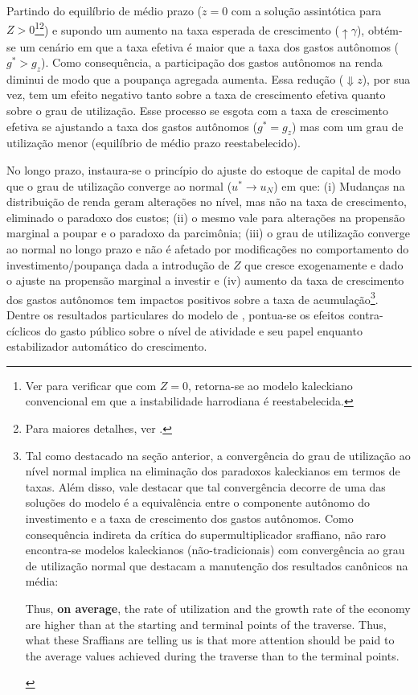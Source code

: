 Partindo do equilíbrio de médio prazo ($\dot z = 0$ com a solução assintótica para $Z >0$\footnote{Ver \textcite[Apêndice A]{allain_tackling_2015} para verificar que com $Z = 0$, retorna-se ao modelo kaleckiano convencional em que a instabilidade harrodiana é reestabelecida.}\footnote{Para maiores detalhes, ver \textcite{fagundes_role_2017}.}) e supondo um aumento na taxa esperada de crescimento ($\uparrow\gamma$), obtém-se um cenário em que a taxa efetiva é maior que a taxa dos gastos autônomos ($g^* > g_z$). Como consequência, a participação dos gastos autônomos na renda diminui de modo que  a poupança agregada aumenta. Essa redução ($\Downarrow z$), por sua vez, tem um efeito negativo tanto sobre a taxa de crescimento efetiva quanto sobre o grau de utilização. Esse processo se esgota com a taxa de crescimento efetiva se ajustando a taxa dos gastos autônomos ($g^* = g_z$) mas com um grau de utilização menor  (equilíbrio de médio prazo reestabelecido). 

No longo prazo, instaura-se o princípio do ajuste do estoque de capital de modo que o grau de utilização converge ao normal ($u^* \to u_N$) em que: (i) Mudanças na distribuição de renda geram alterações no nível, mas não na taxa de crescimento, eliminado o paradoxo dos custos; (ii) o mesmo vale para alterações na propensão marginal a poupar e o paradoxo da parcimônia; (iii) o grau de utilização converge ao normal no longo prazo e não é afetado por modificações no comportamento do investimento/poupança dada a introdução de $Z$ que cresce exogenamente e dado o ajuste na propensão marginal a investir e (iv) aumento da taxa de crescimento dos gastos autônomos tem impactos positivos sobre a taxa de acumulação\footnote{
	Tal como destacado na seção anterior, a convergência do grau de utilização ao nível normal implica na eliminação dos paradoxos kaleckianos em termos de taxas. Além disso, vale destacar que tal convergência decorre de uma das soluções do modelo é a equivalência entre o componente autônomo do investimento e a taxa de crescimento dos gastos autônomos. Como consequência indireta da crítica do supermultiplicador sraffiano, não raro encontra-se modelos kaleckianos (não-tradicionais) com convergência ao grau de utilização normal que destacam a manutenção dos resultados canônicos na média:
	
	\begin{citacao}
		Thus, \textbf{on average}, the rate of utilization and the growth rate of the
		economy are higher than at the starting and terminal points of the traverse. Thus, what
		these Sraffians are telling us is that more attention should be paid to the average values
		achieved during the traverse than to the terminal points.
		\cite[p.~408, grifos adicionados]{lavoie_post-keynesian_2015}
	\end{citacao}
	
}.  Dentre os resultados particulares do modelo de \textcite{allain_tackling_2015}, pontua-se os efeitos contra-cíclicos do gasto público sobre o nível de atividade e seu papel enquanto estabilizador automático do crescimento.

